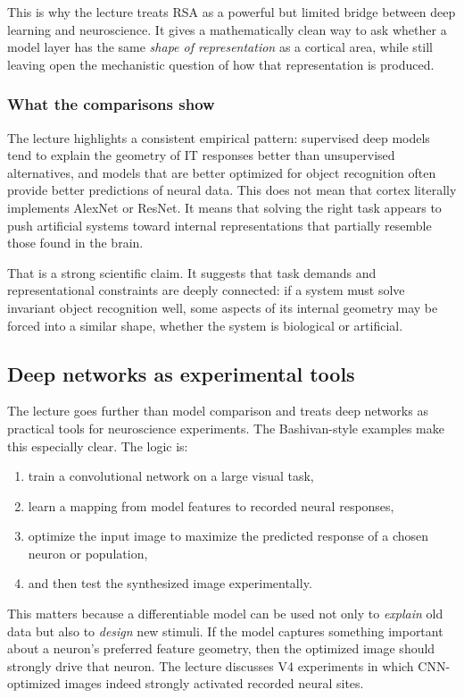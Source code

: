This is why the lecture treats RSA as a powerful but limited bridge between deep learning and neuroscience. It gives a mathematically clean way to ask whether a model layer has the same \emph{shape of representation} as a cortical area, while still leaving open the mechanistic question of how that representation is produced.

\subsubsection{What the comparisons show}

The lecture highlights a consistent empirical pattern: supervised deep models tend to explain the geometry of IT responses better than unsupervised alternatives, and models that are better optimized for object recognition often provide better predictions of neural data. This does not mean that cortex literally implements AlexNet or ResNet. It means that solving the right task appears to push artificial systems toward internal representations that partially resemble those found in the brain.

That is a strong scientific claim. It suggests that task demands and representational constraints are deeply connected: if a system must solve invariant object recognition well, some aspects of its internal geometry may be forced into a similar shape, whether the system is biological or artificial.

\subsection{Deep networks as experimental tools}

The lecture goes further than model comparison and treats deep networks as practical tools for neuroscience experiments. The Bashivan-style examples make this especially clear. The logic is:
\begin{enumerate}
    \item train a convolutional network on a large visual task,
    \item learn a mapping from model features to recorded neural responses,
    \item optimize the input image to maximize the predicted response of a chosen neuron or population,
    \item and then test the synthesized image experimentally.
\end{enumerate}

This matters because a differentiable model can be used not only to \emph{explain} old data but also to \emph{design} new stimuli. If the model captures something important about a neuron's preferred feature geometry, then the optimized image should strongly drive that neuron. The lecture discusses V4 experiments in which CNN-optimized images indeed strongly activated recorded neural sites.

